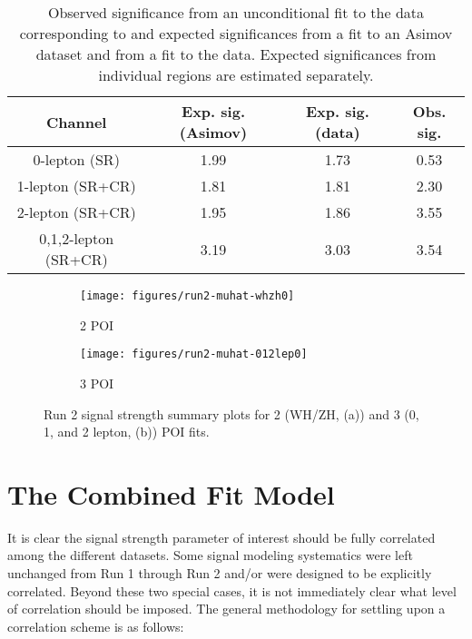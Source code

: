 \begin{table}[!htbp]\captionsetup{justification=centering}

  \centering
  \begin{tabular}{c|||c|c|c}
     \hline\hline
    Channel  & Exp. sig. (Asimov) & Exp. sig. (data) & Obs. sig. \\
     \hline\hline
    0-lepton (SR)          	& 1.99  & 1.73 & 0.53 \\
    1-lepton (SR+CR)     	&  1.81 & 1.81 & 2.30 \\
    2-lepton (SR+CR)         	& 1.95  & 1.86 & 3.55 \\ %
    \hline\hline
    0,1,2-lepton (SR+CR)    &  3.19 & 3.03 & 3.54 \\
    \hline\hline
  \end{tabular}
  \caption{Observed significance from an unconditional fit to the data corresponding to \LUMI and expected significances from a fit to an Asimov dataset and from a fit to the data. Expected significances from individual regions are estimated separately. } 
  \label{tab:nuis_sig}
\end{table}

\begin{figure}[!htbp]\captionsetup{justification=centering}
  \centering
  \begin{subfigure}[t]{0.49\textwidth}\centering\texttt{[image: figures/run2-muhat-whzh0]}\caption{2 POI}\end{subfigure}
  \begin{subfigure}[t]{0.49\textwidth}\centering\texttt{[image: figures/run2-muhat-012lep0]}\caption{3 POI}\end{subfigure}
    \caption{Run 2 signal strength summary plots for 2 (WH/ZH, (a)) and 3 (0, 1, and 2 lepton, (b)) POI fits.}
    \label{fig:r2muhat}
\end{figure}

\clearpage

\section{The Combined Fit Model}
\label{sec:combmodel}
It is clear the signal strength parameter of interest should be fully correlated among the different datasets.  Some signal modeling systematics were left unchanged from Run 1 through Run 2 and/or were designed to be explicitly correlated.  Beyond these two special cases, it is not immediately clear what level of correlation should be imposed.  The general methodology for settling upon a correlation scheme is as follows:

